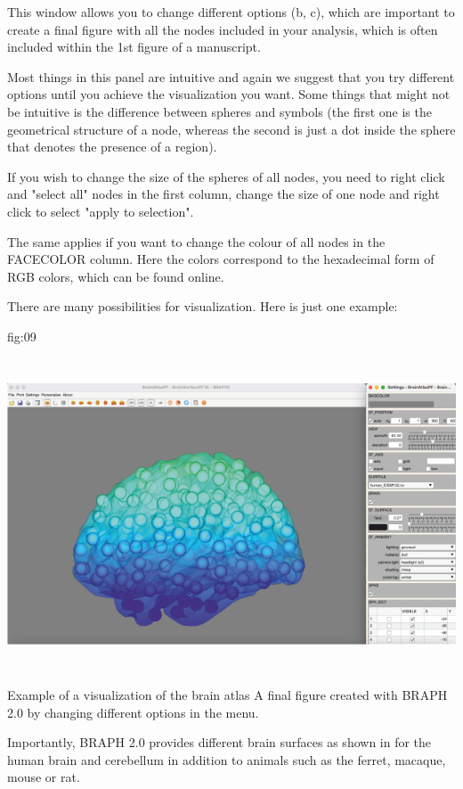 \documentclass[justified]{tufte-handout}
\begin{document}
This window allows you to change different options (b, c), which are important to create a final figure with all the nodes included in your analysis, which is often included within the 1st figure of a manuscript.

Most things in this panel are intuitive and again we suggest that you try different options until you achieve the visualization you want.
Some things that might not be intuitive is the difference between spheres and symbols (the first one is the geometrical structure of a node, whereas the second is just a dot inside the sphere that denotes the presence of a region). 

If you wish to change the size of the spheres of all nodes, you need to right click and "select all" nodes in the first column, change the size of one node and right click to select "apply to selection".

The same applies if you want to change the colour of all nodes in the FACECOLOR column. Here the colors correspond to the hexadecimal form of RGB colors, which can be found online.

There are many possibilities for visualization. Here is just one example:

	{fig:09}
	{\includegraphics[height=10cm]{tut_ba/fig09.png}}
	{Example of a visualization of the brain atlas}
	{
	A final figure created with BRAPH 2.0 by changing different options in the menu.
	}

Importantly, BRAPH 2.0 provides different brain surfaces as shown in  for the human brain and cerebellum in addition to animals such as the ferret, macaque, mouse or rat.
\end{document}
